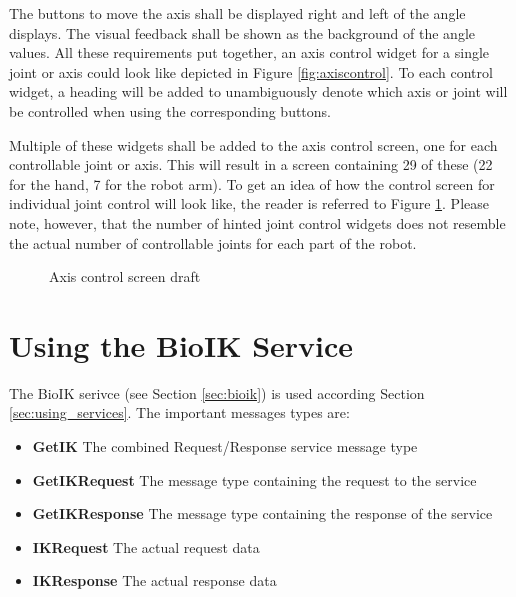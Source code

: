 The buttons to move the axis shall be displayed right and left of the angle displays. The visual feedback shall be shown as the background of the angle values. All these requirements put together, an axis control widget for a single joint or axis could look like depicted in Figure \ref{fig:axiscontrol}. To each control widget, a heading will be added to unambiguously denote which axis or joint will be controlled when using the corresponding buttons.

Multiple of these widgets shall be added to the axis control screen, one for each controllable joint or axis. This will result in a screen containing 29 of these (22 for the hand, 7 for the robot arm). To get an idea of how the control screen for individual joint control will look like, the reader is referred to Figure \ref{fig:axiscontrol:screen}. Please note, however, that the number of hinted joint control widgets does not resemble the actual number of controllable joints for each part of the robot.

\begin{figure}
	\caption{\label{fig:axiscontrol:screen}Axis control screen draft}
\end{figure}

\section{Using the BioIK Service}
\label{sec:robotarm:ctrl}

The BioIK serivce (see Section \ref{sec:bioik}) is used according Section \ref{sec:using_services}. The important messages types are:
\begin{itemize}
	\item \textbf{GetIK} The combined Request/Response service message type
	\item \textbf{GetIKRequest} The message type containing the request to the service
	\item \textbf{GetIKResponse} The message type containing the response of the service
	\item \textbf{IKRequest} The actual request data
	\item \textbf{IKResponse} The actual response data
\end{itemize}

